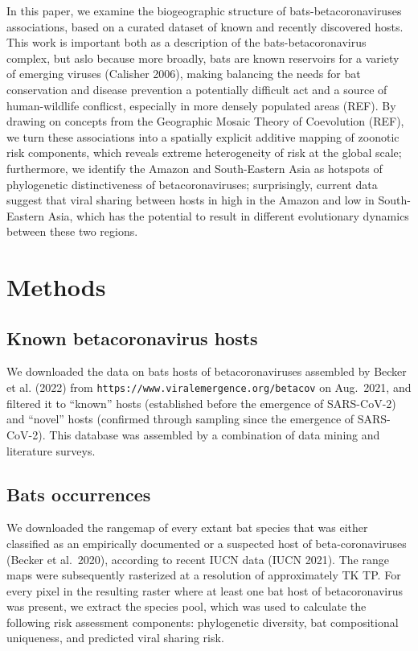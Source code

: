 \documentclass[11pt]{article}
\begin{document}
In this paper, we examine the biogeographic structure of
bats-betacoronaviruses associations, based on a curated dataset of known
and recently discovered hosts. This work is important both as a
description of the bats-betacoronavirus complex, but aslo because more
broadly, bats are known reservoirs for a variety of emerging viruses
(Calisher 2006), making balancing the needs for bat conservation and
disease prevention a potentially difficult act and a source of
human-wildlife conflicst, especially in more densely populated areas
(REF). By drawing on concepts from the Geographic Mosaic Theory of
Coevolution (REF), we turn these associations into a spatially explicit
additive mapping of zoonotic risk components, which reveals extreme
heterogeneity of risk at the global scale; furthermore, we identify the
Amazon and South-Eastern Asia as hotspots of phylogenetic
distinctiveness of betacoronaviruses; surprisingly, current data suggest
that viral sharing between hosts in high in the Amazon and low in
South-Eastern Asia, which has the potential to result in different
evolutionary dynamics between these two regions.

\hypertarget{methods}{%
\section{Methods}\label{methods}}

\hypertarget{known-betacoronavirus-hosts}{%
\subsection{Known betacoronavirus
hosts}\label{known-betacoronavirus-hosts}}

We downloaded the data on bats hosts of betacoronaviruses assembled by
Becker et al. (2022) from
\texttt{https://www.viralemergence.org/betacov} on Aug.~2021, and
filtered it to ``known'' hosts (established before the emergence of
SARS-CoV-2) and ``novel'' hosts (confirmed through sampling since the
emergence of SARS-CoV-2). This database was assembled by a combination
of data mining and literature surveys.

\hypertarget{bats-occurrences}{%
\subsection{Bats occurrences}\label{bats-occurrences}}

We downloaded the rangemap of every extant bat species that was either
classified as an empirically documented or a suspected host of
beta-coronaviruses (Becker et al.~2020), according to recent IUCN data
(IUCN 2021). The range maps were subsequently rasterized at a resolution
of approximately TK TP. For every pixel in the resulting raster where at
least one bat host of betacoronavirus was present, we extract the
species pool, which was used to calculate the following risk assessment
components: phylogenetic diversity, bat compositional uniqueness, and
predicted viral sharing risk.
\end{document}
